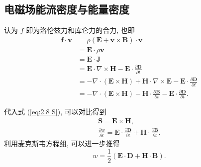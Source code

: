 \subsection{电磁场能流密度与能量密度} \label{proofs: 2}
认为 $f$ 即为洛伦兹力和库仑力的合力, 也即
\begin{equation}
    \begin{aligned}
        \bm{f}\cdot\bm{v} & =\rho(\bm{E}+\bm{v}\times\bm{B})\cdot\bm{v}                                                                                  \\
                          & =\bm{E}\cdot\rho\bm{v}                                                                                                       \\
                          & =\bm{E}\cdot\bm{J}                                                                                                           \\
                          & =\bm{E}\cdot\nabla\times\bm{H}-\bm{E}\cdot\frac{\partial\bm{D}}{\partial t}                                                  \\
                          & =-\nabla\cdot(\bm{E}\times\bm{H})+\bm{H}\cdot\nabla\times\bm{E}-\bm{E}\cdot\frac{\partial\bm{D}}{\partial t}                 \\
                          & =-\nabla\cdot(\bm{E}\times\bm{H})-\bm{H}\cdot\frac{\partial\bm{B}}{\partial t}-\bm{E}\cdot\frac{\partial\bm{D}}{\partial t}.
    \end{aligned}
\end{equation}

代入式 (\ref{eq:2.8 S}), 可以对比得到
\begin{gather}
    \bm{S}=\bm{E}\times\bm{H}, \\
    \frac{\partial w}{\partial t}=\bm{E}\cdot\frac{\partial\bm{D}}{\partial t}+\bm{H}\cdot\frac{\partial\bm{B}}{\partial t}.
\end{gather}
利用麦克斯韦方程组, 可以进一步推得
\begin{equation}
    w=\frac{1}{2}(\bm{E}\cdot\bm{D}+\bm{H}\cdot\bm{B}).
\end{equation}
